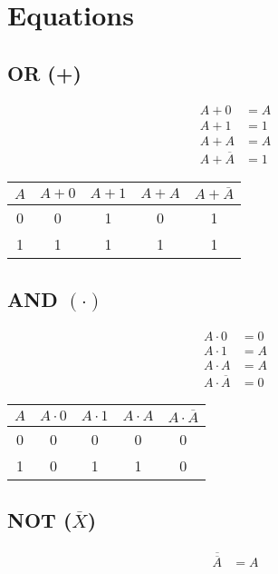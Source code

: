 \documentclass[a4paper, 12pt ]{article}
\begin{document}
   \section*{Equations}
   \subsection*{OR (+)}
      \begin{align*}
         A + 0 &= A\\
         A + 1 &= 1\\
         A + A &= A\\
         A + \overline{A} &= 1
      \end{align*}
      \begin{table}[H]
         \centering
         \begin{center}
            \begin{tabular}{c|c|c|c|c}
               $A$ & $A + 0$ & $A + 1$ & $A + A$ & $A + \overline{A}$\\
               \hline
               0 & 0 & 1 & 0 & 1\\
               1 & 1 & 1 & 1 & 1\\
            \end{tabular}
         \end{center}
      \end{table}
   \subsection*{AND $(\cdot)$}
      \begin{align*}
         A \cdot 0 &= 0\\
         A \cdot 1 &= A\\
         A \cdot A &= A\\
         A \cdot \overline{A} &= 0
      \end{align*}
      \begin{table}[H]
         \centering
         \begin{center}
            \begin{tabular}{c|c|c|c|c}
               $A$ & $A \cdot 0$ & $A \cdot 1$ & $A \cdot A$ & $A \cdot \overline{A}$\\
               \hline
               0 & 0 & 0 & 0 & 0\\
               1 & 0 & 1 & 1 & 0\\
            \end{tabular}
         \end{center}
      \end{table}
   \subsection*{NOT ($\overline{X}$)}
      \begin{align*}
         \overline{\overline{A}} &= A
      \end{align*}
\end{document}
